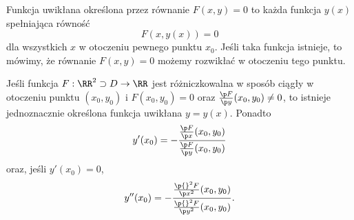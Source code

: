 \begin{definition}
    Funkcja uwikłana określona przez równanie $F(x, y) = 0$ to każda funkcja $y(x)$ spełniająca równość
    \[ F(x, y(x)) = 0 \]
    dla wszystkich $x$ w otoczeniu pewnego punktu $x_0$. Jeśli taka funkcja istnieje, to mówimy, że równanie $F(x, y) = 0$ możemy rozwikłać w otoczeniu tego punktu.
\end{definition}

\begin{theorem}
    Jeśli funkcja $F : \RR^2 \supset D \to \RR$ jest różniczkowalna w sposób ciągły w otoczeniu punktu $(x_0, y_0)$ i $F(x_0, y_0) = 0$ oraz $\frac{\p F}{\p y}(x_0, y_0) \neq 0$, to istnieje jednoznacznie określona funkcja uwikłana $y = y(x)$. Ponadto
    \[ y'(x_0) = -\frac{\frac{\p F}{\p x}(x_0, y_0)}{\frac{\p F}{\p y}(x_0, y_0)} \]
    oraz, jeśli $y'(x_0) = 0$,
    \[ y''(x_0) = -\frac{\frac{\p{}^2 F}{\p x^2}(x_0, y_0)}{\frac{\p{}^2 F}{\p y^2}(x_0, y_0)}. \]
\end{theorem}